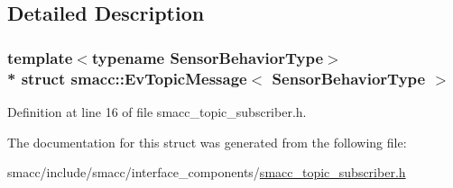 \subsection{Detailed Description}
\subsubsection*{template$<$typename Sensor\+Behavior\+Type$>$\\*
struct smacc\+::\+Ev\+Topic\+Message$<$ Sensor\+Behavior\+Type $>$}



Definition at line 16 of file smacc\+\_\+topic\+\_\+subscriber.\+h.



The documentation for this struct was generated from the following file\+:\begin{DoxyCompactItemize}
\item 
smacc/include/smacc/interface\+\_\+components/\hyperlink{smacc__topic__subscriber_8h}{smacc\+\_\+topic\+\_\+subscriber.\+h}\end{DoxyCompactItemize}
